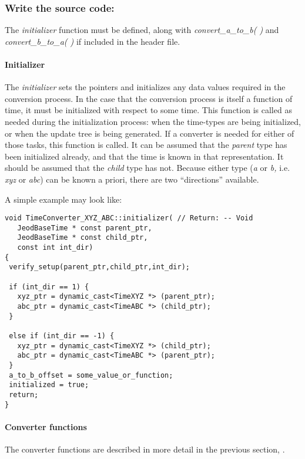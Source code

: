 \subsubsection[\ Write the source code:]{ Write the source code:}
The \textit{initializer} function must be defined, along with
\textit{convert\_a\_to\_b( ) }and \textit{convert\_b\_to\_a( ) } if
included in the header file.




\paragraph{Initializer}
The \textit{initializer} sets the pointers and initializes any data
values required in the conversion process.  In the case that the
conversion process is itself a function of time, it must be initialized
with respect to some time.  This function is called as needed during
the initialization process: when the time-types are being initialized,
or when the update tree is being generated.  If a converter is needed
for either of those tasks, this function is called.  It can be assumed
that the \textit{parent }type has been initialized already, and that
the time is known in that representation.  It should be assumed that
the \textit{child} type has not.  Because either type (\textit{a }or
\textit{b, }i.e.\textit{ xyz }or\textit{ abc})\textit{ }can be known a
priori, there are two {\textquotedblleft}directions{\textquotedblright}
available.

A simple example may look like:

\begin{verbatim}
void TimeConverter_XYZ_ABC::initializer( // Return: -- Void
   JeodBaseTime * const parent_ptr,
   JeodBaseTime * const child_ptr,
   const int int_dir)
{
 verify_setup(parent_ptr,child_ptr,int_dir);

 if (int_dir == 1) {
   xyz_ptr = dynamic_cast<TimeXYZ *> (parent_ptr);
   abc_ptr = dynamic_cast<TimeABC *> (child_ptr);
 }

 else if (int_dir == -1) {
   xyz_ptr = dynamic_cast<TimeXYZ *> (child_ptr);
   abc_ptr = dynamic_cast<TimeABC *> (parent_ptr);
 }
 a_to_b_offset = some_value_or_function;
 initialized = true;
 return;
}
\end{verbatim}

\paragraph{Converter functions}
The converter functions are described in more detail in the previous
section, .

